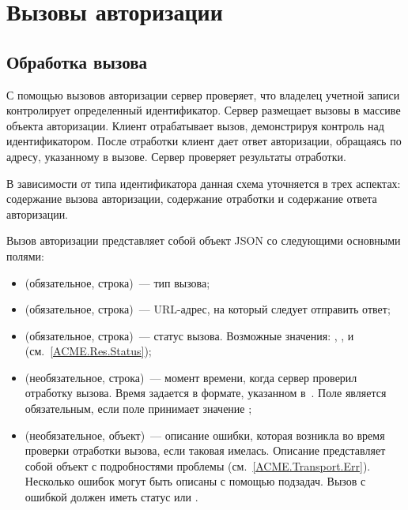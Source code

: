 \section{Вызовы авторизации}\label{ACME.Chall}

\subsection{Обработка вызова}\label{ACME.Chall.Proc}

С помощью вызовов авторизации сервер проверяет, что владелец учетной записи
контролирует определенный идентификатор. Сервер размещает вызовы в массиве
 объекта авторизации. Клиент отрабатывает вызов, демонстрируя
контроль над идентификатором. После отработки клиент дает ответ авторизации,
обращаясь по адресу, указанному в вызове. Сервер проверяет результаты
отработки.

В зависимости от типа идентификатора данная схема уточняется в трех аспектах:
содержание вызова авторизации, содержание отработки и содержание ответа
авторизации.

Вызов авторизации представляет собой объект JSON со следующими основными
полями:
\begin{itemize}
\item
{} (обязательное, строка)~--- тип вызова;

\item
{} (обязательное, строка)~--- URL-адрес, на который следует отправить 
ответ;

\item
{} (обязательное, строка)~--- статус вызова. Возможные значения: 
, ,  и  
(см.~\ref{ACME.Res.Status});

\item
{} (необязательное, строка)~--- момент времени, когда сервер 
проверил отработку вызова. Время задается в формате, указанном 
в~\cite{RFC3339}. Поле  является обязательным, если поле 
 принимает значение ;

\item
{} (необязательное, объект)~--- описание ошибки, которая возникла во
время проверки отработки вызова, если таковая имелась. Описание представляет 
собой объект с подробностями проблемы (см.~\ref{ACME.Transport.Err}). Несколько 
ошибок могут быть описаны с помощью подзадач. Вызов с ошибкой должен иметь 
статус  или .
\end{itemize}

